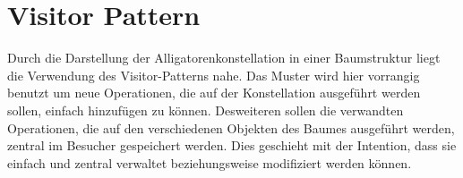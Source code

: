 \section{Visitor Pattern}
Durch die Darstellung der Alligatorenkonstellation in einer Baumstruktur liegt die Verwendung des Visitor-Patterns nahe.
Das Muster wird hier vorrangig benutzt um neue Operationen, die auf der Konstellation ausgeführt werden sollen, einfach hinzufügen zu können.
Desweiteren sollen die verwandten Operationen, die auf den verschiedenen Objekten des Baumes ausgeführt werden, zentral im Besucher gespeichert werden.
Dies geschieht mit der Intention, dass sie einfach und zentral verwaltet beziehungsweise modifiziert werden können.
